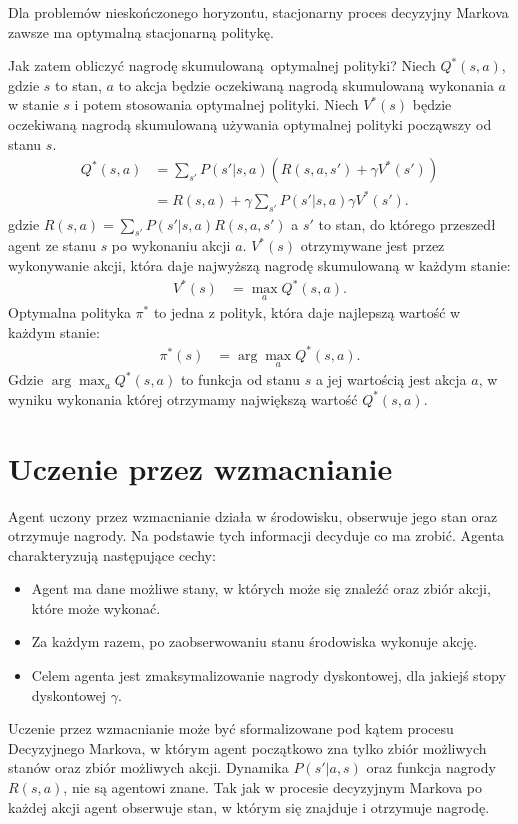 \documentclass[a4paper, 12pt,oneside]{book}
\begin{document}
Dla problemów nieskończonego horyzontu, stacjonarny proces decyzyjny Markova
zawsze ma optymalną stacjonarną politykę. \cite{ai_foundations_policies}

Jak zatem obliczyć nagrodę skumulowaną optymalnej polityki? Niech $Q^*(s,a)$,
gdzie $s$ to stan, $a$ to akcja będzie oczekiwaną nagrodą skumulowaną wykonania
$a$ w stanie $s$ i potem stosowania optymalnej polityki. Niech $V^*(s)$ będzie
oczekiwaną nagrodą skumulowaną używania optymalnej polityki począwszy od stanu
$s$.
\begin{equation} \label{optimal_policy_1}
\begin{split}
	Q^*(s,a) &= \sum_{s'}P(s'|s,a)(R(s,a,s') + \gamma V^*(s'))\\
	&= R(s,a) + \gamma \sum_{s'}P(s'|s,a) \gamma V^*(s').
\end{split}
\end{equation}
gdzie $R(s,a) = \sum_{s'}P(s'|s,a)R(s,a,s')$ a $s'$ to stan, do którego
przeszedł agent ze stanu $s$ po wykonaniu akcji $a$.
$V^*(s)$ otrzymywane jest przez wykonywanie akcji, która daje najwyższą nagrodę
skumulowaną w każdym stanie:
\begin{equation} \label{optimal_policy_2}
\begin{split}
	V^*(s) &= \max_{a} Q^*(s,a).
\end{split}
\end{equation}
Optymalna polityka $\pi^*$ to jedna z polityk, która daje najlepszą wartość w
każdym stanie:
\begin{equation} \label{optimal_policy_3}
\begin{split}
	\pi^*(s) &= \arg\max_{a} Q^*(s,a).
\end{split}
\end{equation}
Gdzie $\arg\max_{a} Q^*(s,a)$ to funkcja od stanu $s$ a jej wartością jest
akcja $a$, w wyniku wykonania której otrzymamy największą wartość $Q^*(s,a)$.

\section{Uczenie przez wzmacnianie}
Agent uczony przez wzmacnianie działa w środowisku, obserwuje jego stan oraz
otrzymuje nagrody. Na podstawie tych informacji decyduje co ma zrobić. Agenta
charakteryzują następujące cechy:
\begin{itemize}
	\setlength\itemsep{-0.4em}
\item Agent ma dane możliwe stany, w których może się znaleźć oraz zbiór akcji,
	które może wykonać.
\item Za każdym razem, po zaobserwowaniu stanu środowiska wykonuje akcję.
\item Celem agenta jest zmaksymalizowanie nagrody dyskontowej, dla jakiejś
	stopy dyskontowej $\gamma$.
\end{itemize}
Uczenie przez wzmacnianie może być sformalizowane pod kątem procesu Decyzyjnego
Markova, w którym agent początkowo zna tylko zbiór możliwych stanów oraz zbiór
możliwych akcji. Dynamika $P(s'|a,s)$ oraz funkcja nagrody $R(s,a)$, nie są
agentowi znane. Tak jak w procesie decyzyjnym Markova po każdej akcji agent
obserwuje stan, w którym się znajduje i otrzymuje nagrodę.
\end{document}
